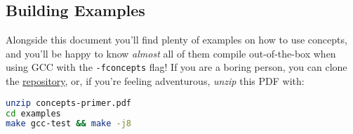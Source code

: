 \subsection*{Building Examples}

Alongside this document you'll find plenty of examples on how to use concepts, and you'll be happy to know \emph{almost} all of them compile out-of-the-box when using GCC with the \texttt{-fconcepts} flag! If you are a boring person, you can clone the \href{https://github.com/CaffeineViking/concepts-primer/tree/master/primer/examples}{repository}, or, if you're feeling adventurous, \emph{unzip} this PDF with:

\begin{lstlisting}[language=bash, morekeywords={unzip, make},
                                  deletekeywords={test}]
unzip concepts-primer.pdf
cd examples
make gcc-test && make -j8
\end{lstlisting}
